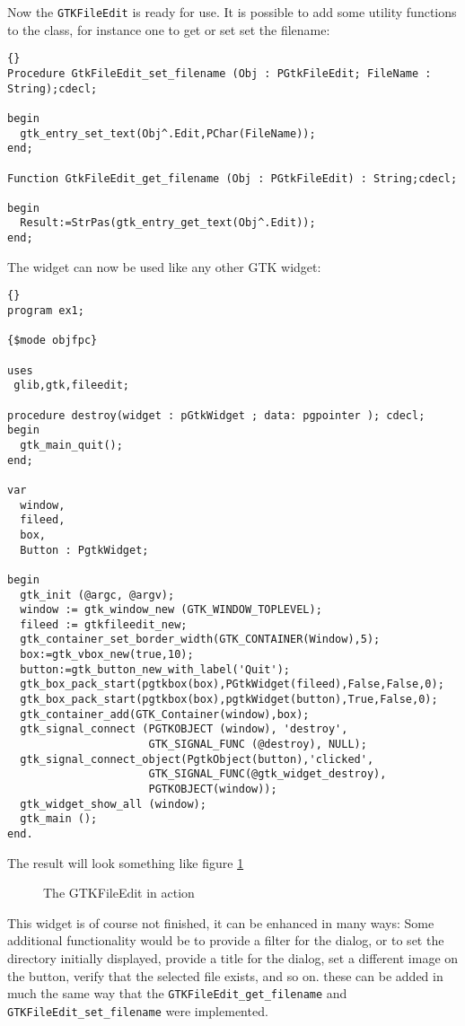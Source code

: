 \documentclass[10pt]{article}
\begin{document}
Now the \lstinline|GTKFileEdit| is ready for use. It is possible to add 
some utility functions to the class, for instance one to get or set set 
the filename:
\begin{lstlisting}{}
Procedure GtkFileEdit_set_filename (Obj : PGtkFileEdit; FileName : String);cdecl;

begin
  gtk_entry_set_text(Obj^.Edit,PChar(FileName));
end;

Function GtkFileEdit_get_filename (Obj : PGtkFileEdit) : String;cdecl;

begin
  Result:=StrPas(gtk_entry_get_text(Obj^.Edit));
end;  
\end{lstlisting}
The widget can now be used like any other GTK widget:
\begin{lstlisting}{}
program ex1;

{$mode objfpc}

uses
 glib,gtk,fileedit;

procedure destroy(widget : pGtkWidget ; data: pgpointer ); cdecl;
begin
  gtk_main_quit();
end;

var
  window,
  fileed,
  box,
  Button : PgtkWidget;
      
begin
  gtk_init (@argc, @argv);
  window := gtk_window_new (GTK_WINDOW_TOPLEVEL);
  fileed := gtkfileedit_new;
  gtk_container_set_border_width(GTK_CONTAINER(Window),5);
  box:=gtk_vbox_new(true,10);
  button:=gtk_button_new_with_label('Quit');
  gtk_box_pack_start(pgtkbox(box),PGtkWidget(fileed),False,False,0);
  gtk_box_pack_start(pgtkbox(box),pgtkWidget(button),True,False,0);
  gtk_container_add(GTK_Container(window),box);
  gtk_signal_connect (PGTKOBJECT (window), 'destroy',
                      GTK_SIGNAL_FUNC (@destroy), NULL);
  gtk_signal_connect_object(PgtkObject(button),'clicked',
                      GTK_SIGNAL_FUNC(@gtk_widget_destroy),
                      PGTKOBJECT(window));
  gtk_widget_show_all (window);
  gtk_main ();
end.
\end{lstlisting}
The result will look something like figure \ref{fig:fileedit}

\begin{figure}[h]
\begin{center}
\caption{The GTKFileEdit in action}\label{fig:fileedit}
\vspace{3mm}
\end{center}
\end{figure}    

This widget is of course not finished, it can be enhanced in many ways:
Some additional functionality would be to provide a filter for the dialog,
or to set the directory initially displayed, provide a title for the dialog,
set a different image on the button, verify that the selected file exists, 
and so on. these can be added in much the same way that the
\lstinline|GTKFileEdit_get_filename| and
\lstinline|GTKFileEdit_set_filename| were implemented.
\end{document}

